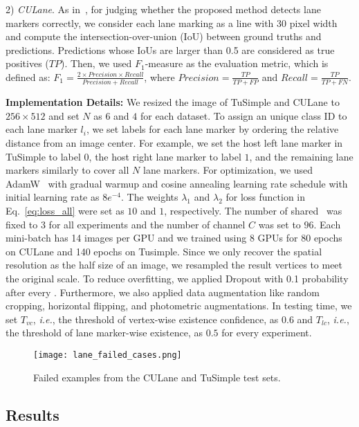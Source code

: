 \documentclass[10pt,twocolumn,letterpaper]{article}
\begin{document}
2) \textit{CULane}. As in~\cite{SpatialAsDeep}, for judging whether the proposed method detects lane markers correctly, we consider each lane marking as a line with 30 pixel width and compute the intersection-over-union (IoU) between ground truths and predictions. Predictions whose IoUs are larger than 0.5 are considered as true positives ($TP$). Then, we used $F_1$-measure as the evaluation metric, which is defined as: $F_{1} = \frac{2 \times Precision \times Recall}{Precision + Recall}$, where $Precision = \frac{TP}{TP+FP}$ and $Recall = \frac{TP}{TP+FN}$.

\vspace{3.px}
\textbf{Implementation Details:} We resized the image of TuSimple and CULane to $256\times512$ and set $N$ as $6$ and $4$ for each dataset. To assign an unique class ID to each lane marker $l_i$, we set labels for each lane marker by ordering the relative distance from an image center. For example, we set the host left lane marker in TuSimple to label $0$, the host right lane marker to label $1$, and the remaining lane markers similarly to cover all $N$ lane markers. For optimization, we used AdamW~\cite{Adamw} with gradual warmup and cosine annealing learning rate schedule with initial learning rate as $8e^{-4}$. The weights $\lambda_1$ and $\lambda_2$ for loss function in Eq.~\ref{eq:loss_all} were set as $10$ and $1$, respectively. The number of shared \reductionname\ was fixed to $3$ for all experiments and the number of channel $C$ was set to $96$. Each mini-batch has 14 images per GPU and we trained using 8 GPUs for 80 epochs on CULane and 140 epochs on Tusimple. Since we only recover the spatial resolution as the half size of an image, we resampled the result vertices to meet the original scale. To reduce overfitting, we applied Dropout with 0.1 probability after every \reductionname. Furthermore, we also applied data augmentation like random cropping, horizontal flipping, and photometric augmentations. In testing time, we set $T_{vc}$, \textit{i.e.}, the threshold of vertex-wise existence confidence, as $0.6$ and $T_{lc}$, \textit{i.e.}, the threshold of lane marker-wise existence, as $0.5$ for every experiment.

\begin{figure}[t]
	\centering
	\texttt{[image: lane\_failed\_cases.png]}
	\caption{Failed examples from the CULane and TuSimple test sets.}
	\label{fig:results_failed}
\end{figure}
\subsection{Results}
\end{document}
